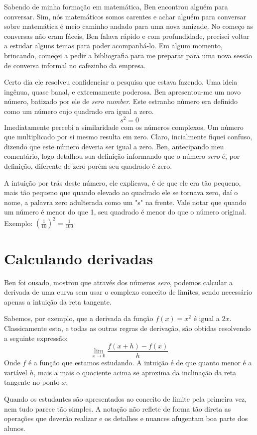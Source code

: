 \documentclass{article}
\begin{document}
Sabendo de minha formação em matemática, Ben encontrou alguém para conversar. Sim, nós matemáticos somos carentes e achar alguém para conversar sobre matemática é meio caminho andado para uma nova amizade. No começo as conversas não eram fáceis, Ben falava rápido e com profundidade, precisei voltar a estudar alguns temas para poder  acompanhá-lo. Em algum momento, brincando, começei a pedir a bibliografia para me preparar para uma nova sessão de conversa informal no cafezinho da empresa. 

Certo dia ele resolveu confidenciar a pesquisa que estava fazendo. Uma ideia ingênua, quase banal, e extremamente poderosa. Ben apresentou-me um novo número, batizado por ele de \textit{sero number}. Este estranho número era definido como um número cujo quadrado era igual a zero.
\[s^2 =0\]Imediatamente percebi a similaridade com os números complexos. Um número que multiplicado por si mesmo resulta em zero. Claro, incialmente fiquei confuso, dizendo que este número deveria ser igual a zero. Ben, antecipando meu comentário, logo detalhou sua definição informando que o número \textit{sero} é, por definição, diferente de zero porém seu quadrado é zero.

A intuição por trás deste número, ele explicava, é de que ele era tão pequeno, mais tão pequeno que quando elevado ao quadrado ele se tornava zero, daí o nome, a palavra zero adulterada como um "s" na frente. Vale notar que quando um número é menor do que 1, seu quadrado é menor do que o número original. Exemplo: \((\frac{1}{10}) ^2 = \frac{1}{100}\)

\section*{Calculando derivadas}

Ben foi ousado, mostrou que através dos números \textit{sero}, podemos calcular a derivada de uma curva sem usar o complexo conceito de limites, sendo necessário apenas a intuição da reta tangente.

Sabemos, por exemplo, que a derivada da função \( f(x) = x^2\) é igual a \(2x\). Classicamente esta, e todas as outras regras de derivação, são obtidas resolvendo a seguinte expressão: 
\[ 
\lim_{x\to 0} \frac{f(x+h) - f(x)}{h}
\] Onde \(f\)  é a função que estamos estudando. A intuição é de que quanto menor é a variável \(h\), mais a mais o quociente acima se aproxima da inclinação da reta tangente no ponto \(x\). 

Quando os estudantes são apresentados ao conceito de limite pela primeira vez, nem tudo parece tão simples. A notação não reflete de forma tão direta as operações que deverão realizar e os detalhes e nuances afugentam boa parte dos alunos.
\end{document}
